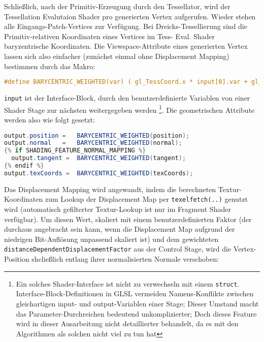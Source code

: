 	Schließlich, nach der Primitiv-Erzeugung durch den Tessellator, wird der Tessellation Evalutaion Shader
	pro generierten Vertex aufgerufen. Wieder stehen alle Eingangs-Patch-Vertices zur Verfügung.
	Bei Dreicks-Tessellierung sind die Primitiv-relativen Koordinaten eines Vertices im Tess- Eval. Shader
	baryzentrische Koordinaten. Die Viewspace-Attribute eines generierten Vertex lassen sich also einfacher
	(zunächst einmal ohne Displacement Mapping) bestimmen durch das Makro:
	\begin{lstlisting}[language=GLSL]
	 #define BARYCENTRIC_WEIGHTED(var) ( gl_TessCoord.x * input[0].var + gl_TessCoord.y * input[1].var + gl_TessCoord.z * input[2].var )
	\end{lstlisting}
	\lstinline|input| ist der Interface-Block, durch den benutzerdefinierte Variablen von einer Shader Stage zur nächsten
	weitergegeben werden 
	\footnote{Ein solches Shader-Interface ist nicht zu verwechseln mit einem \lstinline|struct|. 
	Interface-Block-Definitionen in GLSL vermeiden Namens-Konflikte zwischen gleichartigen input- und output-Variablen 
	einer Stage; Dieser Umstand macht das Parameter-Durchreichen bedeutend unkomplizierter; 
	Doch dieses Feature wird in dieser Ausarbeitung nicht detaillierter behandelt, 
	da es mit den Algorithmen als solchen nicht viel zu tun hat}.
	Die geometrischen Attribute werden also wie folgt gesetzt:
	\begin{lstlisting}[language=GLSL]
output.position =   BARYCENTRIC_WEIGHTED(position);
output.normal   =   BARYCENTRIC_WEIGHTED(normal);
{% if SHADING_FEATURE_NORMAL_MAPPING %}
  output.tangent =  BARYCENTRIC_WEIGHTED(tangent);
{% endif %}
output.texCoords =  BARYCENTRIC_WEIGHTED(texCoords);
	\end{lstlisting}
	
	Das Displacement Mapping wird angewandt, indem die berechneten Textur-Koordinaten zum Lookup
	der Displacement Map per \lstinline|texelfetch(..)| genutzt wird (automatisch gefilterter Textur-Lookup ist nur
	im Fragment Shader verfügbar).
	Um diesen Wert, skaliert mit einem benutzerdefinierten Faktor (der durchaus angebracht sein kann, wenn die
	Displacement Map aufgrund der niedrigen Bit-Auflösung unpassend skaliert ist) und dem gewichteten
	\lstinline|distanceDependentDisplacementFactor| aus der Control Stage, wird die Vertex-Position shcließlich entlang 
	ihrer normalisierten Normale verschoben:
	
